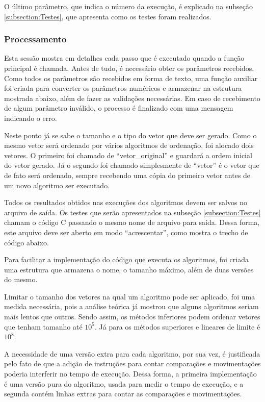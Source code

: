 O último parâmetro, que indica o número da execução, é explicado na subseção \ref{subsection:Testes}, que apresenta como os testes foram realizados.

\subsubsection{Processamento}
Esta sessão mostra em detalhes cada passo que é executado quando a função principal é chamada. Antes de tudo, é necessário obter os parâmetros recebidos. Como todos os parâmetros são recebidos em forma de texto, uma função auxiliar foi criada para converter os parâmetros numéricos e armazenar na estrutura mostrada abaixo, além de fazer as validações necessárias. Em caso de recebimento de algum parâmetro inválido, o processo é finalizado com uma mensagem indicando o erro.


Neste ponto já se sabe o tamanho e o tipo do vetor que deve ser gerado. Como o mesmo vetor será ordenado por vários algoritmos de ordenação, foi alocado dois vetores. O primeiro foi chamado de ``vetor\_original'' e guardará a ordem inicial do vetor gerado. Já o segundo foi chamado simplesmente de ``vetor'' é o vetor que de fato será ordenado, sempre recebendo uma cópia do primeiro vetor antes de um novo algoritmo ser executado. 


Todos os resultados obtidos nas execuções dos algoritmos devem ser salvos no arquivo de saída. Os testes que serão apresentados na subseção \ref{subsection:Testes} chamam o código C passando o mesmo nome de arquivo para saída. Dessa forma, este arquivo deve ser aberto em modo ``acrescentar'', como mostra o trecho de código abaixo.


Para facilitar a implementação do código que executa os algoritmos, foi criada uma estrutura que armazena o nome, o tamanho máximo, além de duas versões do mesmo.

Limitar o tamanho dos vetores na qual um algoritmo pode ser aplicado, foi uma medida necessária, pois a análise teórica já mostrou que alguns algoritmos seriam mais lentos que outros. Sendo assim, os métodos inferiores podem ordenar vetores que tenham tamanho até $10^5$. Já para os métodos superiores e lineares de limite é $10^8$.

A necessidade de uma versão extra para cada algoritmo, por sua vez, é justificada pelo fato de que a adição de instruções para contar comparações e movimentações poderia interferir no tempo de execução. Dessa forma, a primeira implementação é uma versão pura do algoritmo, usada para medir o tempo de execução, e a segunda contém linhas extras para contar as comparações e movimentações.


